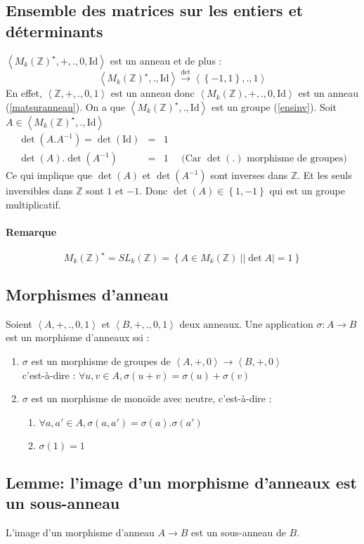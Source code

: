 \documentclass[a4paper,10pt]{article}
\newcommand{\ap}{ \rightarrow} %
\newcommand{\grp}[1]{\left\langle #1 \right\rangle} %
\newcommand{\set}[1]{\left\lbrace #1 \right\rbrace } %
\newcommand{\ZZ}{\mathbb{Z}} %
\newcommand{\id}{\mathrm{Id}} %
\newcommand{\abs}[1]{\left\vert #1 \right\vert} %
\begin{document}
 \subsection{Ensemble des matrices sur les entiers et déterminants}
  $\grp{M_k(\ZZ)^\star,+,.,0,\id}$ est un anneau et de plus :
  $$\grp{M_k(\ZZ)^\star,.,\id} \overset{\det}{\ap}\grp{\set{-1,1},.,1}$$
  En effet, $\grp{\ZZ,+,.,0,1}$ est un anneau donc $\grp{M_k(\ZZ),+,.,0,\id}$ est un anneau (\ref{matsuranneau}). On a que $\grp{M_k(\ZZ)^\star,.,\id}$ est un groupe (\ref{ensinv}).
  Soit $A \in \grp{M_k(\ZZ)^\star,.,\id}$
  \begin{eqnarray*}
   \det(A.A^{-1})=\det(\id) &=& 1\\
   \det(A).\det(A^{-1})&=&1 ~~~~~~\mbox{(Car $\det(.)$ morphisme de groupes)}
  \end{eqnarray*}
  Ce qui implique que $\det(A)$ et $\det(A^{-1})$ sont inverses dans $\ZZ$. Et les seuls inversibles dans $\ZZ$ sont $1$ et $-1$. Donc $\det(A) \in \set{1,-1}$ qui est un groupe multiplicatif.

  \paragraph{Remarque}
  $$M_k(\ZZ)^\star = {SL}_k(\ZZ) = \set{A \in M_k(\ZZ) ~| \abs{\det A} = 1}$$

 \subsection{Morphismes d'anneau}
  Soient $\grp{A,+,.,0,1}$ et $\grp{B,+,.,0,1}$ deux anneaux.
  Une application $\sigma: A \ap B$ est un morphisme d'anneaux ssi :
  \begin{enumerate}
   \item $\sigma$ est un morphisme de groupes de $\grp{A,+,0}\ap\grp{B,+,0}$\\
         c'est-à-dire : $\forall u,v \in A, \sigma(u+v) = \sigma(u)+\sigma(v)$
   \item $\sigma$ est un morphisme de monoïde avec neutre, c'est-à-dire :
         \begin{enumerate}
	  \item $\forall a,a' \in A, \sigma(a,a')= \sigma(a).\sigma(a')$
	  \item $\sigma(1)=1$
	 \end{enumerate}
  \end{enumerate}

 \subsection{Lemme: l'image d'un morphisme d'anneaux est un sous-anneau}
  L'image d'un morphisme d'anneau $A \ap B$ est un sous-anneau de $B$.
\end{document}
